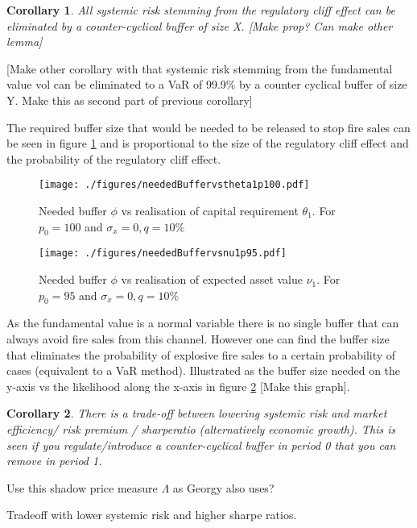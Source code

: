 \documentclass[11pt]{article}
\newtheorem{corollary}{Corollary}
\begin{document}
\begin{corollary}
All systemic risk stemming from the regulatory cliff effect can be eliminated by a counter-cyclical buffer of size X. [Make prop? Can make other lemma] 
\end{corollary}

[Make other corollary with that systemic risk stemming from the fundamental value vol can be eliminated to a VaR of 99.9\% by a counter cyclical buffer of size Y. Make this as second part of previous corollary]

The required buffer size that would be needed to be released to stop fire sales can be seen in figure \ref{f_neededBuffervsRegSize} and is proportional to the size  of the regulatory cliff effect and the probability of the regulatory cliff effect.
\begin{figure}[h]
\centering
\texttt{[image: ./figures/neededBuffervstheta1p100.pdf]}
\caption{Needed buffer $\phi$ vs realisation of capital requirement  $\theta_1$. For $p_0 = 100$ and $\sigma_x = 0, q = 10\%$}
\label{f_neededBuffervsRegSize}
\end{figure}

\begin{figure}[h]
\centering
\texttt{[image: ./figures/neededBuffervsnu1p95.pdf]}
\caption{Needed buffer $\phi$ vs realisation of expected asset value  $\nu_1$. For $p_0 = 95$ and $\sigma_x = 0, q = 10\%$}
\label{f_neededbufvfunShock}
\end{figure}

As the fundamental value is a normal variable there is no single buffer that can always avoid fire sales from this channel. However one can find the buffer size that eliminates the probability of explosive fire sales to a certain probability of cases (equivalent to a VaR method). Illustrated as the buffer size needed on the y-axis vs the likelihood along the x-axis in figure \ref{f_neededbufvfunShock} [Make this graph].

\begin{corollary}
There is a trade-off between lowering systemic risk and market efficiency/ risk premium / sharperatio (alternatively economic growth). This is seen if you regulate/introduce a counter-cyclical buffer in period 0 that you can remove in period 1.
\end{corollary}

Use this shadow price measure $\Lambda$ as Georgy also uses?

Tradeoff with lower systemic risk and higher sharpe ratios.
\end{document}
